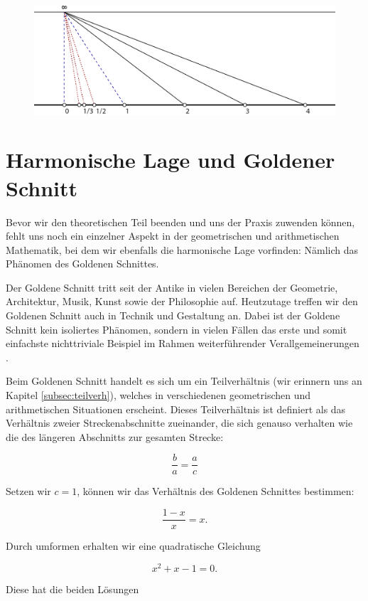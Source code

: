 \documentclass[12pt,a4paper]{article}
\begin{document}
\begin{figure}[htbp]
\includegraphics[width=\textwidth]{Bilder/folge.png}
\end{figure}

\newpage
\section{Harmonische Lage und Goldener Schnitt}

Bevor wir den theoretischen Teil beenden und uns der Praxis zuwenden können, fehlt uns noch ein einzelner Aspekt in der geometrischen und arithmetischen Mathematik, bei dem wir ebenfalls die harmonische Lage vorfinden: Nämlich das Phänomen des Goldenen Schnittes.

Der Goldene Schnitt tritt seit der Antike in  vielen Bereichen der Geometrie, Architektur, Musik, Kunst sowie der Philosophie auf. Heutzutage treffen wir den Goldenen Schnitt auch in Technik und Gestaltung an. Dabei ist der Goldene Schnitt kein isoliertes Phänomen, sondern in vielen Fällen das erste und somit einfachste nichttriviale Beispiel im Rahmen weiterführender Verallgemeinerungen \citep[s.][S.~5]{goldenerSchnitt}.

Beim Goldenen Schnitt handelt es sich um ein Teilverhältnis (wir erinnern uns an Kapitel \ref{subsec:teilverh}), welches in verschiedenen geometrischen und arithmetischen Situationen erscheint. Dieses Teilverhältnis ist definiert als das Verhältnis zweier Streckenabschnitte zueinander, die sich genauso verhalten wie die des längeren Abschnitts zur gesamten Strecke:

\[\dfrac{b}{a} = \dfrac{a}{c}\]

Setzen wir $c = 1$, können wir das Verhältnis des Goldenen Schnittes bestimmen:

\[\dfrac{1-x}{x} = x.\]

Durch umformen erhalten wir eine quadratische Gleichung

\[x^2 + x - 1 = 0.\]

Diese hat die beiden Lösungen
\end{document}
